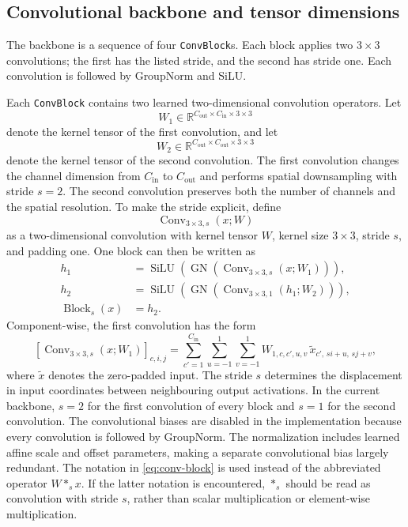 \documentclass[11pt,a4paper]{article}
\begin{document}
\subsection{Convolutional backbone and tensor dimensions}
The backbone is a sequence of four \texttt{ConvBlock}s. Each block applies two $3\times3$ convolutions; the first has the listed stride, and the second has stride one. Each convolution is followed by GroupNorm and SiLU. 

Each \texttt{ConvBlock} contains two learned two-dimensional convolution operators. Let 
\begin{equation} 
	W_1 \in \mathbb{R}^{C_{\mathrm{out}}\times C_{\mathrm{in}}\times3\times3} 
\end{equation} 
denote the kernel tensor of the first convolution, and let 
\begin{equation} 
	W_2 \in \mathbb{R}^{C_{\mathrm{out}}\times C_{\mathrm{out}}\times3\times3} 
\end{equation} 
denote the kernel tensor of the second convolution. The first convolution changes the channel dimension from $C_{\mathrm{in}}$ to $C_{\mathrm{out}}$ and performs spatial downsampling with stride $s=2$. The second convolution preserves both the number of channels and the spatial resolution. To make the stride explicit, define \[ \operatorname{Conv}_{3\times3,s}(x;W) \] as a two-dimensional convolution with kernel tensor $W$, kernel size $3\times3$, stride $s$, and padding one. One block can then be written as 
\begin{align} 
	h_1 &= \operatorname{SiLU} \left( \operatorname{GN} \left( \operatorname{Conv}_{3\times3,s}(x;W_1) \right) \right), \\ 
	h_2 &= \operatorname{SiLU} \left( \operatorname{GN} \left( \operatorname{Conv}_{3\times3,1}(h_1;W_2) \right) \right), \\ \operatorname{Block}_{s}(x) 
	&= h_2. \label{eq:conv-block} 
\end{align} 
Component-wise, the first convolution has the form 
\begin{equation} 
	\left[ \operatorname{Conv}_{3\times3,s}(x;W_1) \right]_{c,i,j} = \sum_{c'=1}^{C_{\mathrm{in}}} \sum_{u=-1}^{1} \sum_{v=-1}^{1} W_{1,c,c',u,v}\, \widetilde{x}_{c',\,si+u,\,sj+v}, \label{eq:strided-convolution} 
\end{equation} where $\widetilde{x}$ denotes the zero-padded input. The stride $s$ determines the displacement in input coordinates between neighbouring output activations. 
In the current backbone, $s=2$ for the first convolution of every block and $s=1$ for the second convolution. The convolutional biases are disabled in the implementation because every convolution is followed by GroupNorm. The normalization includes learned affine scale and offset parameters, making a separate convolutional bias largely redundant. The notation in \eqref{eq:conv-block} is used instead of the abbreviated operator $W *_s x$. If the latter notation is encountered, $*_s$ should be read as convolution with stride $s$, rather than scalar multiplication or element-wise multiplication.
\end{document}
